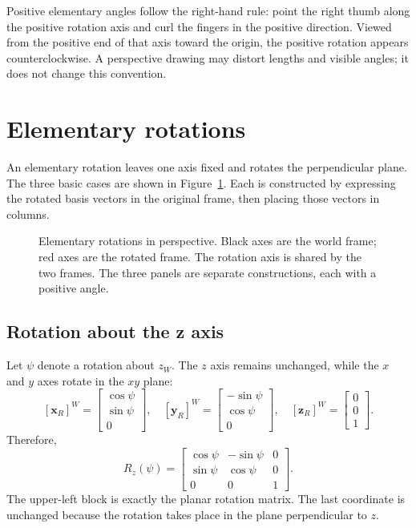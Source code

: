 Positive elementary angles follow the right-hand rule: point the right thumb
along the positive rotation axis and curl the fingers in the positive direction.
Viewed from the positive end of that axis toward the origin, the positive
rotation appears counterclockwise. A perspective drawing may distort lengths
and visible angles; it does not change this convention.

\section{Elementary rotations}
An elementary rotation leaves one axis fixed and rotates the perpendicular
plane. The three basic cases are shown in Figure~\ref{fig:l04-elementary}.
Each is constructed by expressing the rotated basis vectors in the original
frame, then placing those vectors in columns.

\begin{figure}[htbp]
\centering
\caption{Elementary rotations in perspective. Black axes are the world frame;
red axes are the rotated frame. The rotation axis is shared by the two frames.
The three panels are separate constructions, each with a positive angle.}
\label{fig:l04-elementary}
\end{figure}

\subsection{Rotation about the z axis}
Let $\psi$ denote a rotation about $z_W$. The $z$ axis remains unchanged, while
the $x$ and $y$ axes rotate in the $xy$ plane:
\[
 [\boldsymbol{x}_R]^W=\begin{bmatrix}\cos\psi\\\sin\psi\\0\end{bmatrix},\quad
 [\boldsymbol{y}_R]^W=\begin{bmatrix}-\sin\psi\\\cos\psi\\0\end{bmatrix},\quad
 [\boldsymbol{z}_R]^W=\begin{bmatrix}0\\0\\1\end{bmatrix}.
\]
Therefore,
\begin{equation}
 \boxed{R_z(\psi)=\begin{bmatrix}
 \cos\psi&-\sin\psi&0\\\sin\psi&\cos\psi&0\\0&0&1
 \end{bmatrix}.}
 \label{eq:l04-rz}
\end{equation}
The upper-left block is exactly the planar rotation matrix. The last coordinate
is unchanged because the rotation takes place in the plane perpendicular to $z$.

